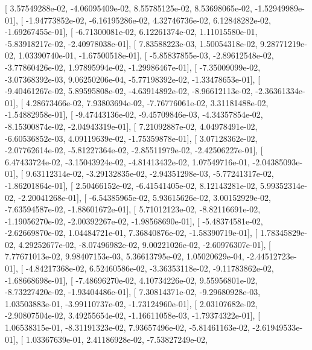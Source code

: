 \documentclass{article}
\begin{document}
       [  3.57549288e-02,  -4.06095409e-02,   8.55785125e-02,
          8.53698065e-02,  -1.52949989e-01],
       [ -1.94773852e-02,  -6.16195286e-02,   4.32746736e-02,
          6.12848282e-02,  -1.69267455e-01],
       [ -6.71300081e-02,   6.12261374e-02,   1.11015580e-01,
         -5.83918217e-02,  -2.40978038e-01],
       [  7.83588223e-03,   1.50054318e-02,   9.28771219e-02,
          1.03390740e-01,  -1.67500518e-01],
       [ -5.85837855e-03,  -2.89612548e-02,  -3.77860426e-02,
          1.97895994e-02,  -1.29986467e-01],
       [ -7.35009099e-02,  -3.07368392e-03,   9.06250206e-04,
         -5.77198392e-02,  -1.33478653e-01],
       [ -9.40461267e-02,   5.89595808e-02,  -4.63914892e-02,
         -8.96612113e-02,  -2.36361334e-01],
       [  4.28673466e-02,   7.93803694e-02,  -7.76776061e-02,
          3.31181488e-02,  -1.54882958e-01],
       [ -9.47443136e-02,  -9.45709846e-03,  -4.34357854e-02,
         -8.15300874e-02,  -2.04943319e-01],
       [  7.21092887e-02,   4.04978491e-02,  -6.60536852e-03,
          4.09119639e-02,  -1.75359878e-01],
       [  3.07128362e-02,  -2.07762614e-02,  -5.81227364e-02,
         -2.85511979e-02,  -2.42506227e-01],
       [  6.47433724e-02,  -3.15043924e-02,  -4.81413432e-02,
          1.07549716e-01,  -2.04385093e-01],
       [  9.63112314e-02,  -3.29132835e-02,  -2.94351298e-03,
         -5.77241317e-02,  -1.86201864e-01],
       [  2.50466152e-02,  -6.41541405e-02,   8.12143281e-02,
          5.99352314e-02,  -2.20041268e-01],
       [ -6.54385965e-02,   5.93615626e-02,   3.00152929e-02,
         -7.63594587e-02,  -1.88601672e-01],
       [  5.71012123e-02,  -8.82116691e-02,  -1.19056270e-02,
         -2.00392267e-02,  -1.98568690e-01],
       [ -5.48374581e-02,  -2.62669870e-02,   1.04484721e-01,
          7.36840876e-02,  -1.58390719e-01],
       [  1.78345829e-02,   4.29252677e-02,  -8.07496982e-02,
          9.00221026e-02,  -2.60976307e-01],
       [  7.77671013e-02,   9.98407153e-03,   5.36613795e-02,
          1.05020629e-04,  -2.44512723e-01],
       [ -4.84217368e-02,   6.52460586e-02,  -3.36353118e-02,
         -9.11783862e-02,  -1.68668698e-01],
       [ -7.48696270e-02,   4.10734226e-02,   9.55956801e-02,
         -8.73227420e-02,  -1.93404486e-01],
       [  7.30814371e-02,  -9.29680928e-03,   1.03503883e-01,
         -3.99110737e-02,  -1.73124960e-01],
       [  2.03107682e-02,  -2.90807504e-02,   3.49255654e-02,
         -1.16611058e-03,  -1.79374322e-01],
       [  1.06538315e-01,  -8.31191323e-02,   7.93657496e-02,
         -5.81461163e-02,  -2.61949533e-01],
       [  1.03367639e-01,   2.41186928e-02,  -7.53827249e-02,
\end{document}
